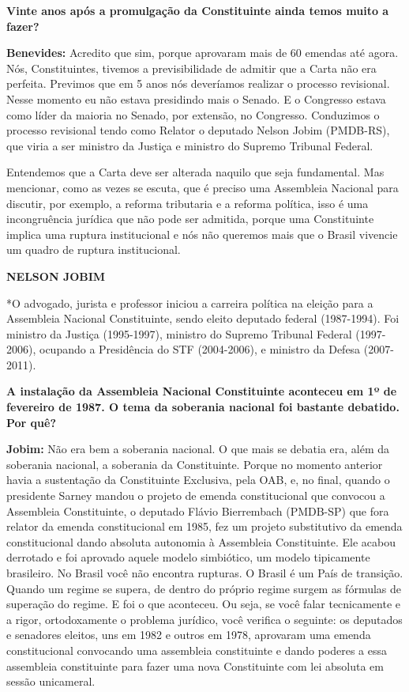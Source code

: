 \textbf{Vinte anos após a promulgação da Constituinte ainda temos muito
a fazer?}

\textbf{Benevides:} Acredito que sim, porque aprovaram mais de 60
emendas até agora. Nós, Constituintes, tivemos a previsibilidade de
admitir que a Carta não era perfeita. Previmos que em 5 anos nós
deveríamos realizar o processo revisional. Nesse momento eu não estava
presidindo mais o Senado. E o Congresso estava como líder da maioria no
Senado, por extensão, no Congresso. Conduzimos o processo revisional
tendo como Relator o deputado Nelson Jobim (PMDB-RS), que viria a ser
ministro da Justiça e ministro do Supremo Tribunal Federal.

Entendemos que a Carta deve ser alterada naquilo que seja fundamental.
Mas mencionar, como as vezes se escuta, que é preciso uma Assembleia
Nacional para discutir, por exemplo, a reforma tributaria e a reforma
política, isso é uma incongruência jurídica que não pode ser admitida,
porque uma Constituinte implica uma ruptura institucional e nós não
queremos mais que o Brasil vivencie um quadro de ruptura institucional.

\textbf{NELSON JOBIM}

*O advogado, jurista e professor iniciou a carreira política na eleição
para a Assembleia Nacional Constituinte, sendo eleito deputado federal
(1987-1994). Foi ministro da Justiça (1995-1997), ministro do Supremo
Tribunal Federal (1997-2006), ocupando a Presidência do STF (2004-2006),
e ministro da Defesa (2007-2011).

\textbf{A instalação da Assembleia Nacional Constituinte aconteceu em 1º
de fevereiro de 1987. O tema da soberania nacional foi bastante
debatido. Por quê?}

\textbf{Jobim:} Não era bem a soberania nacional. O que mais se debatia
era, além da soberania nacional, a soberania da Constituinte. Porque no
momento anterior havia a sustentação da Constituinte Exclusiva, pela
OAB, e, no final, quando o presidente Sarney mandou o projeto de emenda
constitucional que convocou a Assembleia Constituinte, o deputado Flávio
Bierrembach (PMDB-SP) que fora relator da emenda constitucional em 1985,
fez um projeto substitutivo da emenda constitucional dando absoluta
autonomia à Assembleia Constituinte. Ele acabou derrotado e foi aprovado
aquele modelo simbiótico, um modelo tipicamente brasileiro. No Brasil
você não encontra rupturas. O Brasil é um País de transição. Quando um
regime se supera, de dentro do próprio regime surgem as fórmulas de
superação do regime. E foi o que aconteceu. Ou seja, se você falar
tecnicamente e a rigor, ortodoxamente o problema jurídico, você verifica
o seguinte: os deputados e senadores eleitos, uns em 1982 e outros em
1978, aprovaram uma emenda constitucional convocando uma assembleia
constituinte e dando poderes a essa assembleia constituinte para fazer
uma nova Constituinte com lei absoluta em sessão unicameral.

